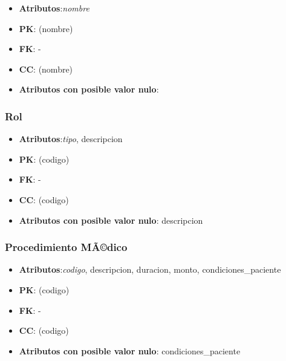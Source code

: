 \documentclass[a4paper,11pt]{article}
\begin{document}
\begin{itemize}

\item 
\textbf{Atributos}:\emph{nombre}

\item 
\textbf{PK}: (nombre)

\item
\textbf{FK}: - 

\item 
\textbf{CC}: (nombre)

\item 
\textbf{Atributos con posible valor nulo}: 
\end{itemize}
\subsubsection{\textbf{Rol}}

\begin{itemize}

\item 
\textbf{Atributos}:\emph{tipo}, descripcion

\item 
\textbf{PK}: (codigo)

\item
\textbf{FK}: - 

\item 
\textbf{CC}: (codigo)

\item 
\textbf{Atributos con posible valor nulo}: descripcion

\end{itemize}

\subsubsection{\textbf{Procedimiento MÃ©dico}}

\begin{itemize}

\item 
\textbf{Atributos}:\emph{codigo}, descripcion, duracion, monto, condiciones\_paciente

\item 
\textbf{PK}: (codigo)

\item
\textbf{FK}: - 

\item 
\textbf{CC}: (codigo)

\item 
\textbf{Atributos con posible valor nulo}: condiciones\_paciente

\end{itemize}
\end{document}
